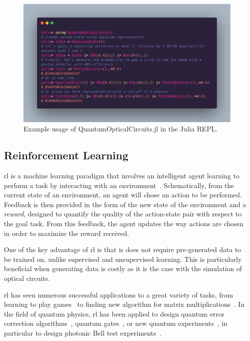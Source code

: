 \begin{figure}
	\begin{center}
		\includegraphics[width=1\textwidth]{chapters/deviceindependent/img/quantumopticalcircuits.png}
	\end{center}
	\caption{Example usage of QuantumOpticalCircuits.jl in the Julia REPL. }
	\label{fig:QOC.jl}
\end{figure}


\subsection{Reinforcement Learning}

\acrfull{rl} is a machine learning paradigm that involves an intelligent agent learning to perform a task by interacting with an environment~\cite{Sutton2018}.
Schematically, from the current state of an environment, an agent will chose an action to be performed.
Feedback is then provided in the form of the new state of the environment and a \textit{reward}, designed to quantify the quality of the action-state pair with respect to the goal task.
From this feedback, the agent updates the way actions are chosen in order to maximize the reward received. 

One of the key advantage of \acrshort{rl} is that is does not require pre-generated data to be trained on, unlike supervised and unsupervised learning.
This is particularly beneficial when generating data is costly as it is the case with the simulation of optical circuits.

\medbreak

\acrshort{rl} has seen numerous successful applications to a great variety of tasks, from learning to play games~\cite{Mnih2015,Silver2017,Vinyals2019} to finding new algorithm for matrix multiplications~\cite{Fawzi2022}.
In the field of quantum physics, \acrshort{rl} has been applied to design quantum error correction algorithms~\cite{Andreasson2019,Nautrup2019,Sweke2020}, quantum gates~\cite{Niu2019}, or new quantum experiments~\cite{Melnikov2018,Krenn2016,Krenn2020,Krenn2021}, in particular to design photonic Bell test experiments~\cite{Melnikov2020}.

